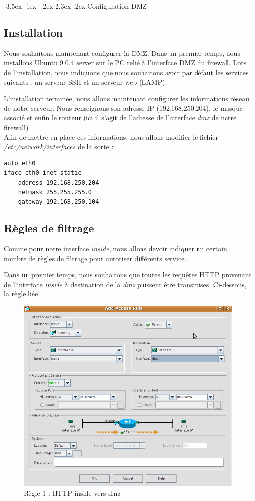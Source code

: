 \documentclass[a4paper,12pt]{article}
\makeatletter
\renewcommand\section{\@startsection {section}{1}{\z@}%
                           {-3.5ex \@plus -1ex \@minus -.2ex}%
                           {2.3ex \@plus.2ex}%
                           {\normalfont\Large\bfseries}}
\makeatother
\begin{document}
\section{Configuration DMZ}
\subsection{Installation}
Nous souhaitons maintenant configurer la DMZ. Dans un premier temps, nous installons \og Ubuntu 9.0.4 server \fg{} sur le PC relié à l'interface DMZ du firewall. Lors de l'installation, nous indiquons que nous souhaitons avoir par défaut les services suivants : un serveur SSH et un serveur web (LAMP).

L'installation terminée, nous allons maintenant configurer les informations réseau de notre serveur. Nous renseignons son adresse IP (192.168.250.204), le masque associé et enfin le routeur (ici il s'agit de l'adresse de l'interface \textit{dmz} de notre firewall).\\
Afin de mettre en place ces informations, nous allons modifier le fichier \textit{/etc/network/interfaces} de la sorte :
\begin{lstlisting}
auto eth0 
iface eth0 inet static
    address 192.168.250.204
    netmask 255.255.255.0
    gateway 192.168.250.104
\end{lstlisting}

\newpage
\subsection{Règles de filtrage}
Comme pour notre interface \textit{inside}, nous allons devoir indiquer un certain nombre de règles de filtrage pour autoriser différents service.

Dans un premier temps, nous souhaitons que toutes les requêtes HTTP provenant de l'interface \textit{inside} à destination de la \textit{dmz} puissent être transmises. Ci-dessous, la règle liée. 
\begin{figure}[H]
	\center
	\includegraphics[width=15cm]{img/10-httpinsidedmz.png}
	\caption{Règle 1 : HTTP inside vers dmz}
\end{figure}
\end{document}
